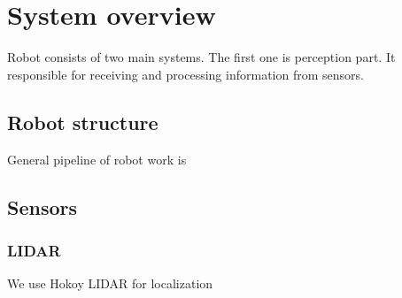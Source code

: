 
\chapter{System overview}
Robot consists of two main systems. The first one is perception part. It responsible for receiving and processing information from sensors. 
\section{Robot structure}
General pipeline of robot work is 
\section{Sensors}
\subsection{LIDAR}
We use Hokoy LIDAR for localization


